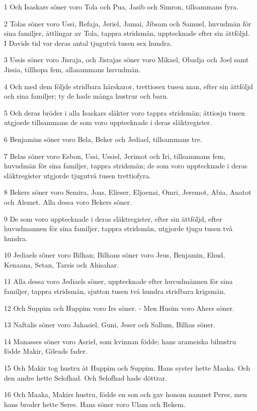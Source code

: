 \par 1 Och Isaskars söner voro Tola och Pua, Jasib och Simron, tillsammans fyra.
\par 2 Tolas söner voro Ussi, Refaja, Jeriel, Jamai, Jibsam och Samuel, huvudmän för sina familjer, ättlingar av Tola, tappra stridsmän, upptecknade efter sin ättföljd. I Davids tid var deras antal tjugutvå tusen sex hundra.
\par 3 Ussis söner voro Jisraja, och Jisrajas söner voro Mikael, Obadja och Joel samt Jissia, tillhopa fem, allasammans huvudmän.
\par 4 Och med dem följde stridbara härskaror, trettiosex tusen man, efter sin ättföljd och sina familjer; ty de hade många hustrur och barn.
\par 5 Och deras bröder i alla Isaskars släkter voro tappra stridsmän; åttiosju tusen utgjorde tillsammans de som voro upptecknade i deras släktregister.
\par 6 Benjamins söner voro Bela, Beker och Jediael, tillsammans tre.
\par 7 Belas söner voro Esbon, Ussi, Ussiel, Jerimot och Iri, tillsammans fem, huvudmän för sina familjer, tappra stridsmän; de som voro upptecknade i deras släktregister utgjorde tjugutvå tusen trettiofyra.
\par 8 Bekers söner voro Semira, Joas, Elieser, Eljoenai, Omri, Jeremot, Abia, Anatot och Alemet. Alla dessa voro Bekers söner.
\par 9 De som voro upptecknade i deras släktregister, efter sin ättföljd, efter huvudmannen för sina familjer, tappra stridsmän, utgjorde tjugu tusen två hundra.
\par 10 Jediaels söner voro Bilhan; Bilhans söner voro Jeus, Benjamin, Ehud, Kenaana, Setan, Tarsis och Ahisahar.
\par 11 Alla dessa voro Jediaels söner, upptecknade efter huvudmännen för sina familjer, tappra stridsmän, sjutton tusen två hundra stridbara krigsmän.
\par 12 Och Suppim och Huppim voro Irs söner. - Men Husim voro Ahers söner.
\par 13 Naftalis söner voro Jahasiel, Guni, Jeser och Sallum, Bilhas söner.
\par 14 Manasses söner voro Asriel, som kvinnan födde; hans arameiska bihustru födde Makir, Gileads fader.
\par 15 Och Makir tog hustru åt Huppim och Suppim. Hans syster hette Maaka. Och den andre hette Selofhad. Och Selofhad hade döttrar.
\par 16 Och Maaka, Makirs hustru, födde en son och gav honom namnet Peres, men hans broder hette Seres. Hans söner voro Ulam och Rekem.
